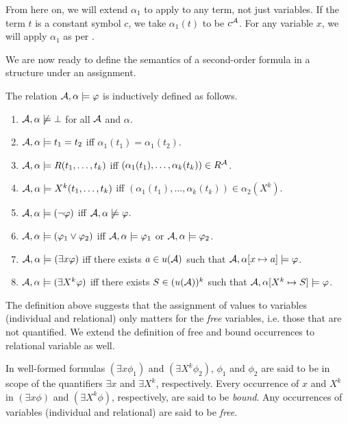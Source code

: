 \documentclass[11pt,twoside=off,numbers=noenddot]{scrbook}
\begin{document}
\begin{abuse}
  From here on, we will extend $\alpha_1$ to apply to any term, not just variables. If the term $t$ is a constant symbol $c$, we take $\alpha_1(t)$ to be $c^{\mathcal{A}}$. For any variable $x$, we will apply $\alpha_1$ as per .
\end{abuse}

We are now ready to define the semantics of a second-order formula in a structure under an assignment.

\begin{definition}
  The relation $\mathcal{A}, \alpha \models \varphi$ is inductively defined as follows.
  \begin{enumerate}
    \item $\mathcal{A}, \alpha \not\models \bot$ for all $\mathcal{A}$ and $\alpha$.
    \item $\mathcal{A}, \alpha \models t_1 = t_2$ iff $\alpha_1(t_1) = \alpha_1(t_2)$.
    \item $\mathcal{A}, \alpha \models R(t_1, \dots, t_k)$ iff $(\alpha_1(t_1), \dots, \alpha_k(t_k)) \in R^{\mathcal{A}}$.
    \item $\mathcal{A}, \alpha \models X^k(t_1, \dots, t_k)$ iff $(\alpha_1(t_1), \dots, \alpha_k(t_k)) \in \alpha_2(X^k)$.
    \item $\mathcal{A}, \alpha \models (\neg \varphi)$ iff $\mathcal{A}, \alpha \not\models \varphi$.
    \item $\mathcal{A}, \alpha \models (\varphi_1 \vee \varphi_2)$ iff $\mathcal{A}, \alpha \models \varphi_1$ or $\mathcal{A}, \alpha \models \varphi_2$.
    \item $\mathcal{A}, \alpha \models (\exists x \varphi)$ iff there exists $a \in u(\mathcal{A})$ such that $\mathcal{A}, \alpha[x \mapsto a] \models \varphi$.
    \item $\mathcal{A}, \alpha \models (\exists X^k \varphi)$ iff there exists $S \in (u(\mathcal{A}))^k$ such that $\mathcal{A}, \alpha[X^k \mapsto S] \models \varphi$.
  \end{enumerate}
\end{definition}

The definition above suggests that the assignment of values to variables (individual and relational) only matters for the \emph{free} variables, i.e. those that are not quantified. We extend the definition of free and bound occurrences to relational variable as well.

\begin{definition}
  In well-formed formulas $(\exists x \phi_1)$ and $(\exists X^k \phi_2)$, $\phi_1$ and $\phi_2$ are said to be in scope of the quantifiers $\exists x$ and $\exists X^k$, respectively. Every occurrence of $x$ and $X^k$ in $(\exists x \phi)$ and $(\exists X^k \phi)$, respectively, are said to be \emph{bound}. Any occurrences of variables (individual and relational) are said to be \emph{free}.
\end{definition}
\end{document}

